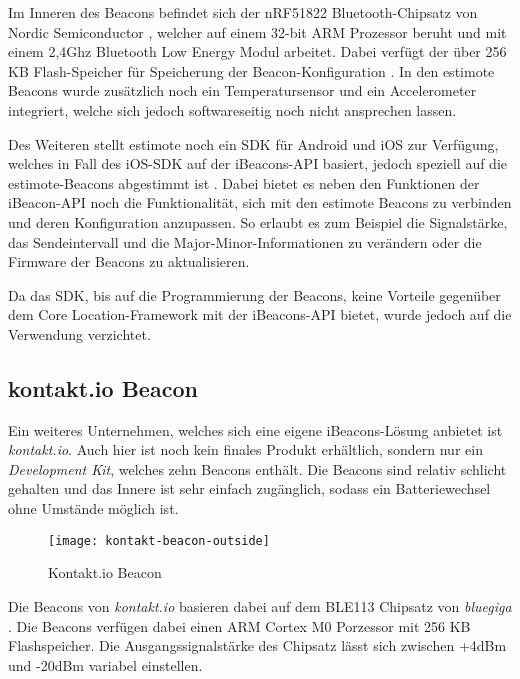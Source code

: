 Im Inneren des Beacons befindet sich der nRF51822 Bluetooth-Chipsatz von Nordic Semiconductor \cite{nordicchipset}, welcher auf einem 32-bit ARM Prozessor beruht und mit einem 2,4Ghz Bluetooth Low Energy Modul arbeitet. Dabei verfügt der über 256 KB Flash-Speicher für Speicherung der Beacon-Konfiguration \cite{estimotespecs} .
In den estimote Beacons wurde zusätzlich noch ein Temperatursensor und ein Accelerometer integriert, welche sich jedoch softwareseitig noch nicht ansprechen lassen.

Des Weiteren stellt estimote noch ein SDK für Android und iOS zur Verfügung, welches in Fall des iOS-SDK auf der iBeacons-API basiert, jedoch speziell auf die estimote-Beacons abgestimmt ist \cite{estimoteapi} . 
Dabei bietet es neben den Funktionen der iBeacon-API noch die Funktionalität, sich mit den estimote Beacons zu verbinden und deren Konfiguration anzupassen. So erlaubt es zum Beispiel die Signalstärke, das Sendeintervall und die Major-Minor-Informationen zu verändern oder die Firmware der Beacons zu aktualisieren.

Da das SDK, bis auf die Programmierung der Beacons, keine Vorteile gegenüber dem Core Location-Framework mit der iBeacons-API bietet, wurde jedoch auf die Verwendung verzichtet.

\subsection{kontakt.io Beacon}
\label{sec:dataandmeasurement:mobilebeacon:kontaktio}
Ein weiteres Unternehmen, welches sich eine eigene iBeacons-Lösung anbietet ist \emph{kontakt.io}. Auch hier ist noch kein finales Produkt erhältlich, sondern nur ein \emph{Development Kit}, welches zehn Beacons enthält. 
Die Beacons sind relativ schlicht gehalten und das Innere ist sehr einfach zugänglich, sodass ein Batteriewechsel ohne Umstände möglich ist.


\begin{figure}[htb!]
		\centering
	\texttt{[image: kontakt-beacon-outside]}
	\caption{Kontakt.io Beacon}
	\label{kontakt-beacon-outside}
\end{figure}

Die Beacons von \emph{kontakt.io} basieren dabei auf dem BLE113 Chipsatz von \emph{bluegiga} \cite{bluegigachipset}. Die Beacons verfügen dabei einen ARM Cortex M0 Porzessor mit 256 KB Flashspeicher. Die Ausgangssignalstärke des Chipsatz lässt sich zwischen +4dBm und -20dBm variabel einstellen.


